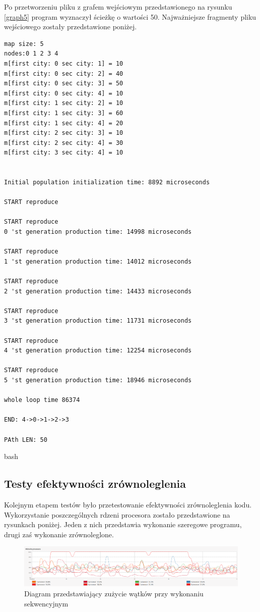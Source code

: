 \documentclass[10pt,a4paper]{article}
\begin{document}
Po przetworzeniu pliku z grafem wejściowym przedstawionego na rysunku \ref{graph5} program wyznaczył ścieżkę o wartości 50. Najważniejsze fragmenty pliku wejściowego zostały przedstawione poniżej.

\begin{verbatim}
map size: 5
nodes:0 1 2 3 4 
m[first city: 0 sec city: 1] = 10
m[first city: 0 sec city: 2] = 40
m[first city: 0 sec city: 3] = 50
m[first city: 0 sec city: 4] = 10
m[first city: 1 sec city: 2] = 10
m[first city: 1 sec city: 3] = 60
m[first city: 1 sec city: 4] = 20
m[first city: 2 sec city: 3] = 10
m[first city: 2 sec city: 4] = 30
m[first city: 3 sec city: 4] = 10


Initial population initialization time: 8892 microseconds

START reproduce

START reproduce
0 'st generation production time: 14998 microseconds

START reproduce
1 'st generation production time: 14012 microseconds

START reproduce 
2 'st generation production time: 14433 microseconds

START reproduce
3 'st generation production time: 11731 microseconds

START reproduce 
4 'st generation production time: 12254 microseconds

START reproduce
5 'st generation production time: 18946 microseconds

whole loop time 86374

END: 4->0->1->2->3

PAth LEN: 50
\end{verbatim}{bash}

\subsection{Testy efektywności zrównoleglenia}
Kolejnym etapem testów było przetestowanie efektywności zrównoleglenia kodu. Wykorzystanie poszczególnych rdzeni procesora zostało przedstawione na rysunkach poniżej. Jeden z nich przedstawia wykonanie szeregowe programu, drugi zaś wykonanie zrównoleglone.


\begin{figure}[H]
\includegraphics[scale=0.2]{zrzutSequence.png}
\centering
\caption{\label{diagramSequence}Diagram przedstawiający zużycie wątków przy wykonaniu sekwencyjnym}
\end{figure}
\end{document}

